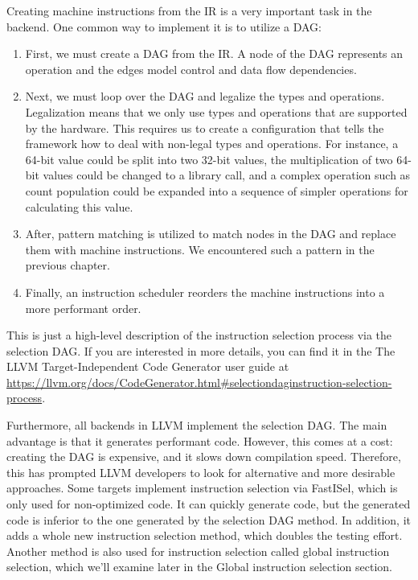 

Creating machine instructions from the IR is a very important task in the backend. One common way to implement it is to utilize a DAG:

\begin{enumerate}
\item
First, we must create a DAG from the IR. A node of the DAG represents an operation and the edges model control and data flow dependencies.

\item
Next, we must loop over the DAG and legalize the types and operations. Legalization means that we only use types and operations that are supported by the hardware. This requires us to create a configuration that tells the framework how to deal with non-legal types and operations. For instance, a 64-bit value could be split into two 32-bit values, the multiplication of two 64-bit values could be changed to a library call, and a complex operation such as count population could be expanded into a sequence of simpler operations for calculating this value.

\item
After, pattern matching is utilized to match nodes in the DAG and replace them with machine instructions. We encountered such a pattern in the previous chapter.

\item
Finally, an instruction scheduler reorders the machine instructions into a more performant order.
\end{enumerate}

This is just a high-level description of the instruction selection process via the selection DAG. If you are interested in more details, you can find it in the The LLVM Target-Independent Code Generator user guide at \url{https://llvm.org/docs/CodeGenerator.html#selectiondaginstruction-selection-process}.

Furthermore, all backends in LLVM implement the selection DAG. The main advantage is that it generates performant code. However, this comes at a cost: creating the DAG is expensive, and it slows down compilation speed. Therefore, this has prompted LLVM developers to look for alternative and more desirable approaches. Some targets implement instruction selection via FastISel, which is only used for non-optimized code. It can quickly generate code, but the generated code is inferior to the one generated by the selection DAG method. In addition, it adds a whole new instruction selection method, which doubles the testing effort. Another method is also used for instruction selection called global instruction selection, which we’ll examine later in the Global instruction selection section.

